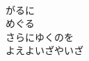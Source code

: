 \documentclass[10pt,b5j]{tarticle} %
\begin{document}
\begin{enumerate}
\begin{minipage}[c]{\blocksize}
    \end{minipage}
    \begin{minipage}[c]{\blocksize}
        
        \vspace{\linespace}
        \item~\\
        がるに\\
        めぐる\\
        さらにゆくのを\\
        よえよいざやいざ
    
    \end{minipage}
\end{enumerate} %
\end{document}
